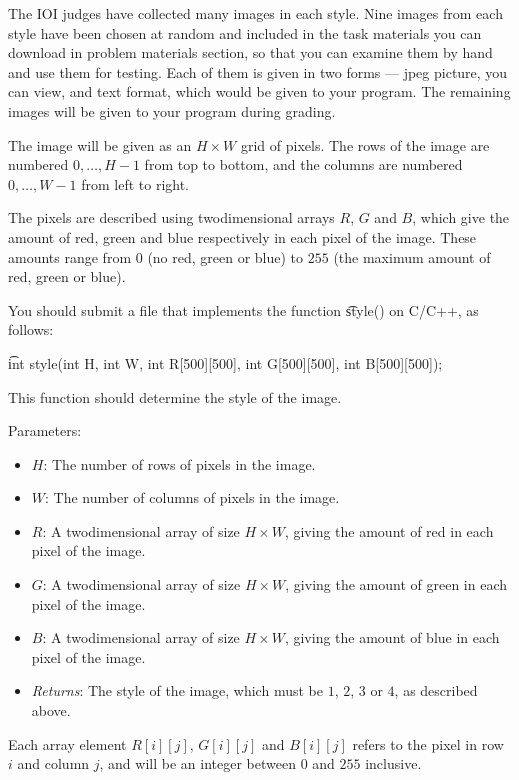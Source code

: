 The IOI judges have collected many images in each style. Nine images from each style
have been chosen at random and included in the task materials you can download in problem materials section, so that you can examine them by hand and use them for testing. Each of them is given in two forms --- jpeg picture, you can view, and text format, which would be given to your program. The remaining images will be given to your program during grading.

The image will be given as an $H \times W$ grid of pixels. The rows of the image are numbered
$0, \dots, H ­- 1$ from top to bottom, and the columns are numbered $0, \dots, W ­- 1$ from left to right.

The pixels are described using two­dimensional arrays $R$, $G$ and $B$, which give the
amount of red, green and blue respectively in each pixel of the image. These amounts range
from $0$ (no red, green or blue) to $255$ (the maximum amount of red, green or blue).

You should submit a file that implements the function \t{style()} on C/C++, as follows:

\t{int style(int H, int W, int R[500][500], int G[500][500], int B[500][500]);}

This function should determine the style of the image.

Parameters:
\begin{itemize}
\item $H$: The number of rows of pixels in the image.
\item $W$: The number of columns of pixels in the image.
\item $R$: A two­dimensional array of size $H \times W$, giving the amount of red in each pixel of the image.
\item $G$: A two­dimensional array of size $H \times W$, giving the amount of green in each pixel of the image.
\item $B$: A two­dimensional array of size $H \times W$, giving the amount of blue in each pixel of the image.
\item \textit{Returns}: The style of the image, which must be $1$, $2$, $3$ or $4$, as described above.
\end{itemize}

Each array element $R[i][j]$, $G[i][j]$ and $B[i][j]$ refers to the pixel in row $i$ and
column $j$, and will be an integer between $0$ and $255$ inclusive.